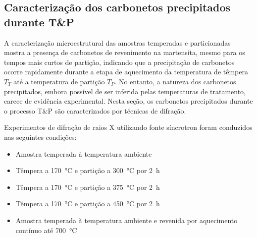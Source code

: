 

\subsection{Caracterização dos carbonetos precipitados durante T\&P}

A caracterização microestrutural das amostras temperadas e particionadas mostra a presença de carbonetos de revenimento na martensita, mesmo para os tempos mais curtos de partição, indicando que a precipitação de carbonetos ocorre rapidamente durante a etapa de aquecimento da temperatura de têmpera $T_T$ até a temperatura de partição $T_P$. No entanto, a natureza dos carbonetos precipitados, embora possível de ser inferida pelas temperaturas de tratamento, carece de evidência experimental. Nesta seção, os carbonetos precipitados durante o processo T\&P são caracterizados por técnicas de difração.

Experimentos de difração de raios X  utilizando fonte síncrotron foram conduzidos nas seguintes condições:

\begin{itemize}
  \item Amostra temperada à temperatura ambiente
  \item Têmpera a \SI{170}{\degreeCelsius} e partição a \SI{300}{\degreeCelsius} por 2~h
  \item Têmpera a \SI{170}{\degreeCelsius} e partição a \SI{375}{\degreeCelsius} por 2~h
  \item Têmpera a \SI{170}{\degreeCelsius} e partição a \SI{450}{\degreeCelsius} por 2~h
  \item Amostra temperada à temperatura ambiente e revenida por aquecimento contínuo até \SI{700}{\degreeCelsius}
\end{itemize}

